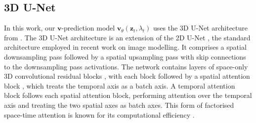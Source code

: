\documentclass[ oneside,%
                    author={George Herbert},
                    degree={MSci},
                     title={Diffusion Models for Time-Evolving Precipitation Fields},
                  subtitle={}]{dissertation}
\begin{document}


\subsection{3D U-Net}
\label{sec:background_unet}

In this work, our $\mathbf{v}$-prediction model $\mathbf{v}_\theta(\mathbf{z}_t, \lambda_t)$ uses the 3D U-Net architecture from \cite{VDM_Ho}. The 3D U-Net architecture is an extension of the 2D U-Net \cite{Ronneberger_U-Net, Salimans_PixelCNN}, the standard architecture employed in recent work on image modelling. It comprises a spatial downsampling pass followed by a spatial upsampling pass with skip connections to the downsampling pass activations. The network contains layers of space-only 3D convolutional residual blocks \cite{VDM_Ho}, with each block followed by a spatial attention block \cite{Vaswani_Attention_is_All_You_Need, Wang_Non-Local_Neural_Networks, Chen_PixelSNAIL}, which treats the temporal axis as a batch axis. A temporal attention block follows each spatial attention block, performing attention over the temporal axis and treating the two spatial axes as batch axes. This form of factorised space-time attention is known for its computational efficiency \cite{Arnab_ViViT, Bertasius_Is_Space-Time_Attention_All_You_Need, Ho_Axial_Attention_in_Multidimensional_Transformers}.
\end{document}
